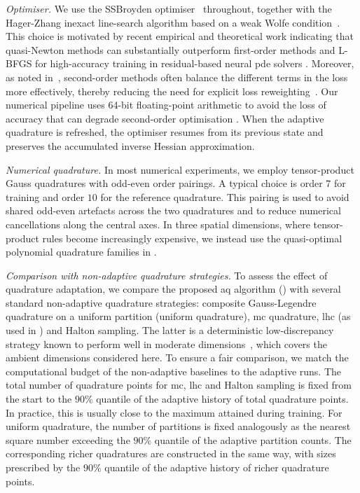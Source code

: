 \documentclass[oneside,reqno,11pt,a4paper]{amsart}
\theoremstyle{definition}
\begin{document}
\medskip
\noindent
\emph{Optimiser.}
We use the SSBroyden optimiser~\cite{Al-Baali1998}
throughout, together with the Hager-Zhang inexact line-search algorithm based
on a weak Wolfe condition~\cite{HagerZhang2006}. This
choice is motivated by recent empirical and theoretical work indicating that
quasi-Newton methods can substantially outperform first-order methods and
L-BFGS for high-accuracy training in residual-based neural \ac{pde} solvers
\cite{UrbanPINNOpt2025, KiyaniOpt2025, Wang2025gradalign}. Moreover, as noted
in~\cite{Wang2025gradalign, KiyaniOpt2025}, second-order methods often balance
the different terms in the loss more effectively, thereby reducing the need for
explicit loss reweighting~\cite{WangPathology2021, Wang2022PINNsFailure}.
Our numerical pipeline uses 64-bit floating-point arithmetic to avoid the loss
of accuracy that can degrade second-order optimisation
\cite{KiyaniOpt2025}. When the adaptive quadrature is refreshed,
the optimiser resumes from its previous state and preserves the accumulated
inverse Hessian approximation.

\medskip
\noindent
\emph{Numerical quadrature.}
In most numerical experiments, we employ tensor-product Gauss quadratures with
odd-even order pairings. A typical choice is order $7$ for training and order
$10$ for the reference quadrature. This pairing is used to avoid shared
odd-even artefacts across the two quadratures and to reduce
numerical cancellations along the central axes. In three spatial dimensions,
where tensor-product rules become increasingly expensive, we instead use the
quasi-optimal polynomial quadrature families in
\cite{WitherdenVincent2015,XiaoGimbutas2010}.

\medskip
\noindent
\emph{Comparison with non-adaptive quadrature strategies.}
To assess the effect of quadrature adaptation, we compare the proposed
\ac{aq} algorithm () with several standard non-adaptive
quadrature strategies: composite Gauss-Legendre quadrature on a uniform partition (uniform quadrature), \ac{mc} quadrature, \ac{lhc} (as used in  
\cite{PINNs2019}) and Halton sampling. The latter is a
deterministic low-discrepancy strategy known to perform well in moderate
dimensions~\cite{MorokoffQMC1995}, which covers the ambient dimensions
considered here. To ensure a fair comparison, we match the computational budget of the
non-adaptive baselines to the adaptive runs. The
total number of quadrature points for \ac{mc}, \ac{lhc} and
Halton sampling is fixed from the start to the $90\%$ quantile of the adaptive
history of total quadrature points. In practice, this is usually close to the
maximum attained during training. For uniform quadrature, the number of
partitions is fixed analogously as the nearest square number exceeding the
$90\%$ quantile of the adaptive partition counts. The corresponding richer
quadratures are constructed in the same way, with sizes prescribed by the
$90\%$ quantile of the adaptive history of richer quadrature points.
\end{document}
